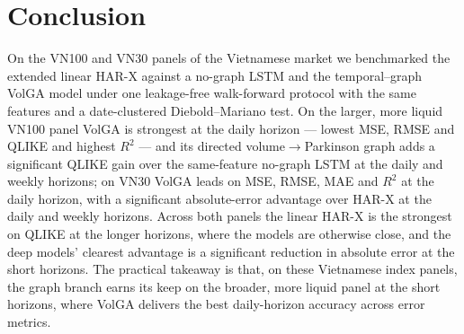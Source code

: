 \documentclass[runningheads]{llncs}
\begin{document}
\section{Conclusion}
On the VN100 and VN30 panels of the Vietnamese market we benchmarked the extended linear HAR-X against
a no-graph LSTM and the temporal--graph VolGA model under one leakage-free walk-forward protocol with
the same features and a date-clustered Diebold--Mariano test. On the larger, more liquid VN100 panel
VolGA is strongest at the daily horizon --- lowest MSE, RMSE and QLIKE and highest $R^2$ --- and its
directed volume$\to$Parkinson graph adds a significant QLIKE gain over the same-feature no-graph LSTM
at the daily and weekly horizons; on VN30 VolGA leads on MSE, RMSE, MAE and $R^2$ at the daily
horizon, with a significant absolute-error advantage over HAR-X at the daily and weekly horizons.
Across both panels the linear HAR-X is the strongest on QLIKE at the longer horizons, where the models
are otherwise close, and the deep models' clearest advantage is a significant reduction in absolute
error at the short horizons. The practical takeaway is that, on these Vietnamese index panels, the
graph branch earns its keep on the broader, more liquid panel at the short horizons, where VolGA
delivers the best daily-horizon accuracy across error metrics.
\end{document}
